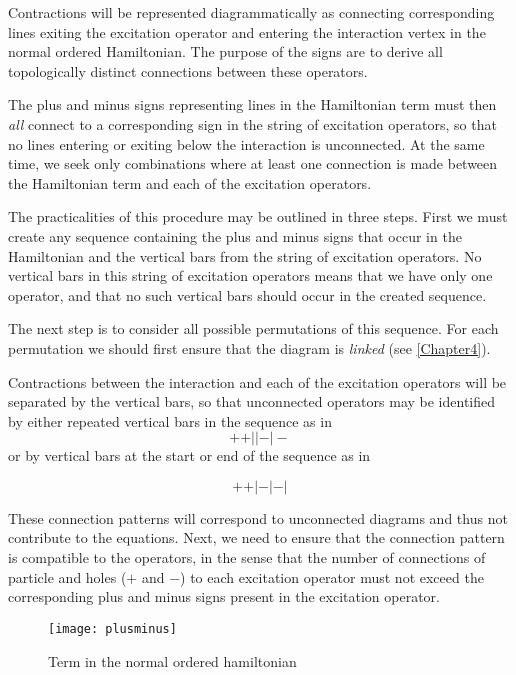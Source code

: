 Contractions will be represented diagrammatically as connecting
corresponding lines exiting the excitation operator and entering the
interaction vertex in the normal ordered Hamiltonian. The purpose of
the signs are to derive all topologically distinct connections between
these operators.

The plus and minus signs representing lines in the Hamiltonian term
must then \emph{all} connect to a corresponding sign in the string of
excitation operators, so that no lines entering or exiting below the
interaction is unconnected. At the same time, we seek only
combinations where at least one connection is made between the
Hamiltonian term and each of the excitation operators.

The practicalities of this procedure may be outlined in three steps.
First we must create any sequence containing the plus and minus signs
that occur in the Hamiltonian and the vertical bars from the string of
excitation operators. No vertical bars in this string of excitation
operators means that we have only one operator, and that no such
vertical bars should occur in the created sequence.

The next step is to consider all possible permutations of this
sequence. For each permutation we should first ensure that the diagram is \emph{linked} (see \ref{Chapter4}).

Contractions between the interaction and each of the excitation operators will be separated by
the vertical bars, so that unconnected operators may be identified by
either repeated vertical bars in the sequence as in
\begin{equation}
+ + \vert \vert - \vert -
\end{equation}
or by vertical bars at the start or end of the sequence as in

\begin{equation}
+ + \vert -\vert - \vert
\end{equation}



These connection patterns will correspond to unconnected diagrams and thus not contribute to the equations. 
Next, we need to ensure that the connection pattern is compatible to the operators, in the sense that the number
of connections of particle and holes ($+$ and $-$) to each excitation
operator must not exceed the corresponding plus and minus signs
present in the excitation operator.

\begin{figure}[hbtp]
 \centering
  \texttt{[image: plusminus]}
  \caption{Term in the normal ordered hamiltonian}\label{fig:plusminus}
\end{figure}

